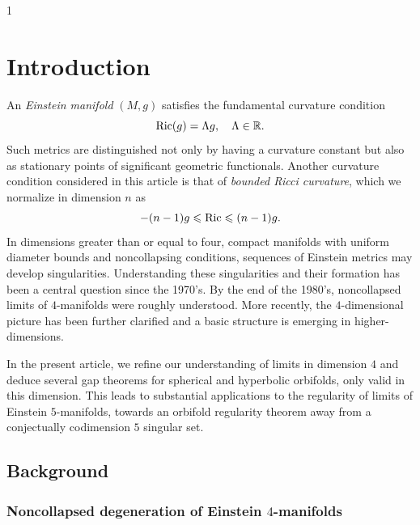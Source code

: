 \documentclass[11pt,reqno]{amsart}
\numberwithin{equation}{section}
\newcommand{\Ric}{{\rm Ric}}
\theoremstyle{definition}
\theoremstyle{remark}
\begin{document}
\maketitle
\vspace{-1.4cm}
\setcounter{tocdepth}1
\tableofcontents



\section{Introduction}



An \textit{Einstein manifold} $(M,g)$ satisfies the fundamental curvature condition
\begin{equation}\label{eq:Einstein}
\Ric(g) = \Lambda g, \quad \Lambda \in \mathbb{R}.
\end{equation} 
Such metrics are distinguished not only by having a curvature constant but also as stationary points of significant geometric functionals. Another curvature condition considered in this article is that of \textit{bounded Ricci curvature}, which we normalize in dimension $n$ as $$-(n-1)g\leqslant \Ric\leqslant (n-1)g.$$
In dimensions greater than or equal to four, compact manifolds with uniform diameter bounds and noncollapsing conditions, sequences of Einstein metrics may develop singularities. Understanding these singularities and their formation has been a central question since the 1970's. By the end of the 1980's, noncollapsed limits of $4$-manifolds were roughly understood. More recently, the $4$-dimensional picture has been further clarified and a basic structure is emerging in higher-dimensions.

In the present article, we refine our understanding of limits in dimension $4$ and deduce several gap theorems for spherical and hyperbolic orbifolds, only valid in this dimension. This leads to substantial applications to the regularity of limits of Einstein $5$-manifolds, towards an orbifold regularity theorem away from a conjectually codimension $5$ singular set.

\subsection{Background}

\subsubsection{Noncollapsed degeneration of Einstein $4$-manifolds}
\end{document}
